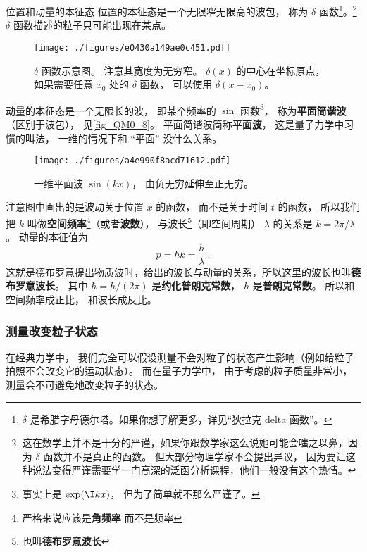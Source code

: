 \begin{example}{位置和动量的本征态}
位置的本征态是一个无限窄无限高的波包， 称为 $\delta$ 函数\footnote{$\delta$ 是希腊字母德尔塔。如果你想了解更多，详见“狄拉克 delta 函数”。}。\footnote{这在数学上并不是十分的严谨，如果你跟数学家这么说她可能会嗤之以鼻，因为 $\delta$ 函数并不是真正的函数。 但大部分物理学家不会提出异议， 因为要让这种说法变得严谨需要学一门高深的泛函分析课程，他们一般没有这个热情。} $\delta$ 函数描述的粒子只可能出现在某点。 
\begin{figure}[ht]
\centering
\texttt{[image: ./figures/e0430a149ae0c451.pdf]}
\caption{$\delta$ 函数示意图。 注意其宽度为无穷窄。 $\delta(x)$ 的中心在坐标原点， 如果需要任意 $x_0$ 处的 $\delta$ 函数， 可以使用 $\delta(x - x_0)$。} \label{fig_QM0_9} %
\end{figure}

动量的本征态是一个无限长的波， 即某个频率的 $\sin$ 函数\footnote{事实上是 $\exp(\I kx)$， 但为了简单就不那么严谨了。}， 称为\textbf{平面简谐波}（区别于波包）， 见\autoref{fig_QM0_8}。 平面简谐波简称\textbf{平面波}， 这是量子力学中习惯的叫法， 一维的情况下和 “平面” 没什么关系。

\begin{figure}[ht]
\centering
\texttt{[image: ./figures/a4e990f8acd71612.pdf]}
\caption{一维平面波 $\sin(kx)$， 由负无穷延伸至正无穷。} \label{fig_QM0_8}
\end{figure}

注意图中画出的是波动关于位置 $x$ 的函数， 而不是关于时间 $t$ 的函数， 所以我们把 $k$ 叫做\textbf{空间频率}\footnote{严格来说应该是\textbf{角频率} 而不是频率}（或者\textbf{波数}）， %
与波长\footnote{也叫\textbf{德布罗意波长}}（即空间周期） $\lambda$ 的关系是 $k = 2\pi/\lambda$。 动量的本征值为
\begin{equation}\label{eq_QM0_1}
p = \hbar k = \frac{h}{\lambda}~.
\end{equation}
这就是德布罗意提出物质波时，给出的波长与动量的关系，所以这里的波长也叫\textbf{德布罗意波长}。 其中 $\hbar = h / (2\pi)$ 是\textbf{约化普朗克常数}， $h$ 是\textbf{普朗克常数}。 所以和空间频率成正比， 和波长成反比。
\end{example}

\subsubsection{测量改变粒子状态}
在经典力学中， 我们完全可以假设测量不会对粒子的状态产生影响（例如给粒子拍照不会改变它的运动状态）。 而在量子力学中， 由于考虑的粒子质量非常小， 测量会不可避免地改变粒子的状态。

